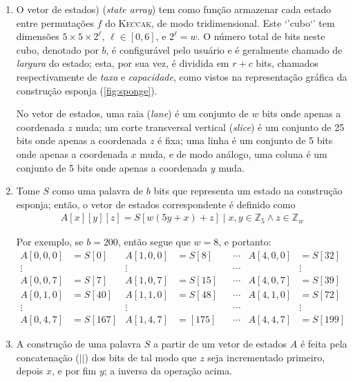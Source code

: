 \documentclass{article}
\begin{document}
\begin{enumerate}[label=(\alph*)]

\item O vetor de estados) (\emph{state array}) tem como função armazenar
cada estado entre permutações $f$ do \textsc{Keccak}, de modo tridimensional.
Este `'cubo`' tem dimensões $5 \times 5 \times 2^{\ell}$, $\ell \in [0, 6]$, e
$2^{\ell} = w$. O número total de bits neste cubo, denotado por $b$, é
configurável pelo usuário e é geralmente chamado de \emph{largura} do estado;
esta, por sua vez, é dividida em $r + c$ bits, chamados respectivamente de
\emph{taxa} e \emph{capacidade}, como vistos na representação gráfica da
construção esponja (\ref{fig:sponge}).

No vetor de estados, uma raia (\emph{lane}) é um conjunto de $w$ bits onde
apenas a coordenada $z$ muda; um corte transversal vertical (\emph{slice}) é
um conjunto de 25 bits onde apenas a coordenada $z$ é fixa; uma linha é um
conjunto de 5 bits onde apenas a coordenada $x$ muda, e de modo análogo, uma
coluna é um conjunto de 5 bits onde apenas a coordenada $y$ muda.

\item Tome $S$ como uma palavra de $b$ bits que representa um estado na
construção esponja; então, o vetor de estados correspondente é definido como
\begin{align*}
A[x][y][z] = S[w(5y+x)+z] \mid x, y \in \mathbb{Z}_5 \land z \in \mathbb{Z}_w
\end{align*}

Por exemplo, se $b = 200$, então segue que $w = 8$, e portanto:
\begin{align*}
A[0, 0, 0] &= S[0]   & A[1, 0, 0] &= S[8]  & & \cdots & A[4, 0, 0] &= S[32] \\
\vdots && \vdots &&& \cdots && \vdots \\
A[0, 0, 7] &= S[7]   & A[1, 0, 7] &= S[15] & & \cdots & A[4, 0, 7] &= S[39] \\
A[0, 1, 0] &= S[40]  & A[1, 1, 0] &= S[48] & & \cdots & A[4, 1, 0] &= S[72] \\
\vdots && \vdots &&& \cdots && \vdots \\
A[0, 4, 7] &= S[167] & A[1, 4, 7] &= [175] & & \cdots & A[4, 4, 7] &= S[199]
\end{align*}

\item A construção de uma palavra $S$ a partir de um vetor de estados $A$ é
feita pela concatenação ($||$) dos bits de tal modo que $z$ seja incrementado
primeiro, depois $x$, e por fim $y$; a inversa da operação acima.


\end{enumerate}
\end{document}
